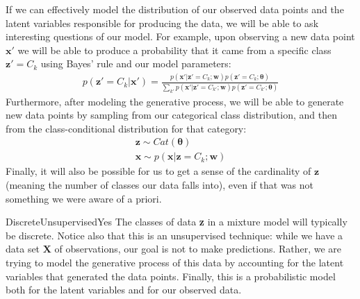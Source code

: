 If we can effectively model the distribution of our observed data points and the latent variables responsible for producing the data, we will be able to ask interesting questions of our model. For example, upon observing a new data point $\textbf{x}'$ we will be able to produce a probability that it came from a specific class $\textbf{z}' = C_k$ using Bayes' rule and our model parameters:
\begin{align*}
    p(\textbf{z}' = C_k | \textbf{x}') = \frac{p(\textbf{x}' | \textbf{z}' = C_{k}; \textbf{w})p(\textbf{z}' = C_{k} ; \boldsymbol{\theta})}{\sum_{k'} p(\textbf{x}' | \textbf{z}' = C_{k'}; \textbf{w})p(\textbf{z}' = C_{k'} ; \boldsymbol{\theta})}
\end{align*}
Furthermore, after modeling the generative process, we will be able to generate new data points by sampling from our categorical class distribution, and then from the class-conditional distribution for that category:
\begin{align*}
    \textbf{z} \sim Cat(\boldsymbol{\theta}) \\
    \textbf{x} \sim p(\textbf{x} | \textbf{z} = C_{k}; \textbf{w})
\end{align*}
Finally, it will also be possible for us to get a sense of the cardinality of $\textbf{z}$ (meaning the number of classes our data falls into), even if that was not something we were aware of a priori.

\begin{mlcube}{Discrete}{Unsupervised}{Yes}
    The classes of data \textbf{z} in a mixture model will typically be discrete. Notice also that this is an unsupervised technique: while we have a data set $\textbf{X}$ of observations, our goal is not to make predictions. Rather, we are trying to model the generative process of this data by accounting for the latent variables that generated the data points. Finally, this is a probabilistic model both for the latent variables and for our observed data.
\end{mlcube}

